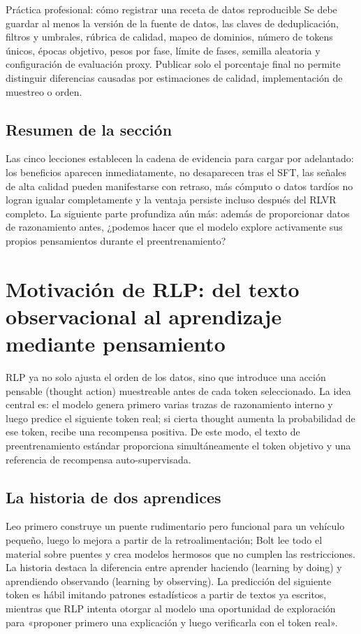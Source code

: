 \documentclass[a4paper]{article}
\begin{document}
\begin{knowledgebox}{Práctica profesional: cómo registrar una receta de datos reproducible}
Se debe guardar al menos la versión de la fuente de datos, las claves de deduplicación, filtros y umbrales, rúbrica de calidad, mapeo de dominios, número de tokens únicos, épocas objetivo, pesos por fase, límite de fases, semilla aleatoria y configuración de evaluación proxy. Publicar solo el porcentaje final no permite distinguir diferencias causadas por estimaciones de calidad, implementación de muestreo o orden.
\end{knowledgebox}

\subsection{Resumen de la sección}

Las cinco lecciones establecen la cadena de evidencia para cargar por adelantado: los beneficios aparecen inmediatamente, no desaparecen tras el SFT, las señales de alta calidad pueden manifestarse con retraso, más cómputo o datos tardíos no logran igualar completamente y la ventaja persiste incluso después del RLVR completo. La siguiente parte profundiza aún más: además de proporcionar datos de razonamiento antes, ¿podemos hacer que el modelo explore activamente sus propios pensamientos durante el preentrenamiento?
\section{Motivación de RLP: del texto observacional al aprendizaje mediante pensamiento}

RLP ya no solo ajusta el orden de los datos, sino que introduce una acción pensable (thought action) muestreable antes de cada token seleccionado. La idea central es: el modelo genera primero varias trazas de razonamiento interno y luego predice el siguiente token real; si cierta thought aumenta la probabilidad de ese token, recibe una recompensa positiva. De este modo, el texto de preentrenamiento estándar proporciona simultáneamente el token objetivo y una referencia de recompensa auto-supervisada.

\subsection{La historia de dos aprendices}

Leo primero construye un puente rudimentario pero funcional para un vehículo pequeño, luego lo mejora a partir de la retroalimentación; Bolt lee todo el material sobre puentes y crea modelos hermosos que no cumplen las restricciones. La historia destaca la diferencia entre aprender haciendo (learning by doing) y aprendiendo observando (learning by observing). La predicción del siguiente token es hábil imitando patrones estadísticos a partir de textos ya escritos, mientras que RLP intenta otorgar al modelo una oportunidad de exploración para «proponer primero una explicación y luego verificarla con el token real».
\end{document}
